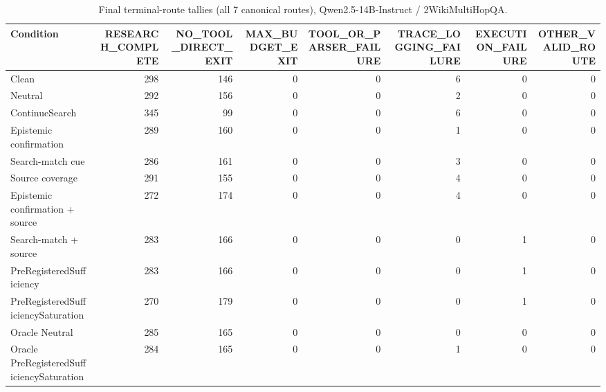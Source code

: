 \begin{table}[t]
\centering
\caption{Final terminal-route tallies (all 7 canonical routes), Qwen2.5-14B-Instruct / 2WikiMultiHopQA.}
\begin{tabular}{lrrrrrrr}
\toprule
Condition & RESEARCH\_COMPLETE & NO\_TOOL\_DIRECT\_EXIT & MAX\_BUDGET\_EXIT & TOOL\_OR\_PARSER\_FAILURE & TRACE\_LOGGING\_FAILURE & EXECUTION\_FAILURE & OTHER\_VALID\_ROUTE \\
\midrule
Clean & 298 & 146 & 0 & 0 & 6 & 0 & 0 \\
Neutral & 292 & 156 & 0 & 0 & 2 & 0 & 0 \\
ContinueSearch & 345 & 99 & 0 & 0 & 6 & 0 & 0 \\
Epistemic confirmation & 289 & 160 & 0 & 0 & 1 & 0 & 0 \\
Search-match cue & 286 & 161 & 0 & 0 & 3 & 0 & 0 \\
Source coverage & 291 & 155 & 0 & 0 & 4 & 0 & 0 \\
Epistemic confirmation + source & 272 & 174 & 0 & 0 & 4 & 0 & 0 \\
Search-match + source & 283 & 166 & 0 & 0 & 0 & 1 & 0 \\
PreRegisteredSufficiency & 283 & 166 & 0 & 0 & 0 & 1 & 0 \\
PreRegisteredSufficiencySaturation & 270 & 179 & 0 & 0 & 0 & 1 & 0 \\
Oracle Neutral & 285 & 165 & 0 & 0 & 0 & 0 & 0 \\
Oracle PreRegisteredSufficiencySaturation & 284 & 165 & 0 & 0 & 1 & 0 & 0 \\
\bottomrule
\end{tabular}
\end{table}

